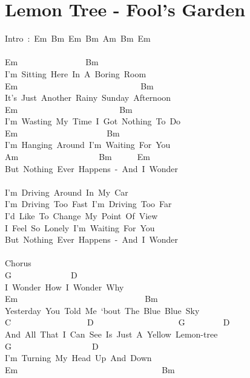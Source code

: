 \documentclass[]{book}
\let\stdsection\section
\renewcommand\section{\clearpage\stdsection}
\begin{document}
\hypertarget{lemon-tree---fools-garden}{%
\section{Lemon Tree - Fool's Garden}\label{lemon-tree---fools-garden}}

Intro~:~Em~Bm~Em~Bm~Am~Bm~Em\\
~\\
Em~~~~~~~~~~~~~~~~Bm\\
I'm~Sitting~Here~In~A~Boring~Room\\
Em~~~~~~~~~~~~~~~~~~~~~~~~~~~~~Bm\\
It's~Just~Another~Rainy~Sunday~Afternoon\\
Em~~~~~~~~~~~~~~~~~~~~~~~~Bm\\
I'm~Wasting~My~Time~I~Got~Nothing~To~Do\\
Em~~~~~~~~~~~~~~~~~~~~~Bm\\
I'm~Hanging~Around~I'm~Waiting~For~You\\
\hspace*{0.333em}\hspace*{0.333em}\hspace*{0.333em}\hspace*{0.333em}Am~~~~~~~~~~~~~~~~~~~Bm~~~~~~Em\\
But~Nothing~Ever~Happens~-~And~I~Wonder\\
~\\
I'm~Driving~Around~In~My~Car\\
I'm~Driving~Too~Fast~I'm~Driving~Too~Far\\
I'd~Like~To~Change~My~Point~Of~View\\
I~Feel~So~Lonely~I'm~Waiting~For~You\\
But~Nothing~Ever~Happens~-~And~I~Wonder\\
~\\
Chorus\\
G~~~~~~~~~~~~~~D\\
I~Wonder~How~I~Wonder~Why\\
Em~~~~~~~~~~~~~~~~~~~~~~~~~~~~~~Bm\\
Yesterday~You~Told~Me~`bout~The~Blue~Blue~Sky\\
C~~~~~~~~~~~~~~~~~~D~~~~~~~~~~~~~~~~~~~~G~~~~~~~~~D\\
And~All~That~I~Can~See~Is~Just~A~Yellow~Lemon-tree\\
G~~~~~~~~~~~~~~~~~~~D\\
I'm~Turning~My~Head~Up~And~Down\\
\hspace*{0.333em}Em~~~~~~~~~~~~~~~~~~~~~~~~~~~~~~~~~~Bm\\
\end{document}
